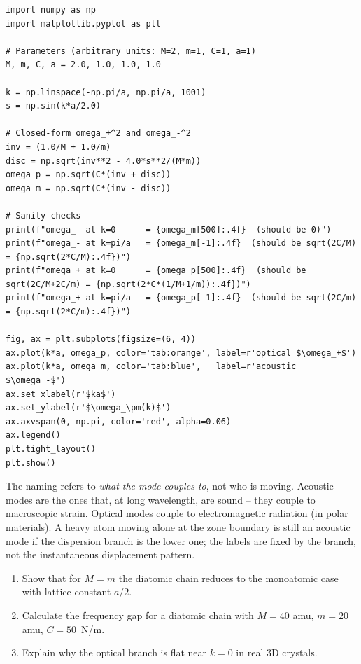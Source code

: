 \documentclass[11pt,a4paper]{article}
\begin{document}
\begin{pybox}
\begin{lstlisting}
import numpy as np
import matplotlib.pyplot as plt

# Parameters (arbitrary units: M=2, m=1, C=1, a=1)
M, m, C, a = 2.0, 1.0, 1.0, 1.0

k = np.linspace(-np.pi/a, np.pi/a, 1001)
s = np.sin(k*a/2.0)

# Closed-form omega_+^2 and omega_-^2
inv = (1.0/M + 1.0/m)
disc = np.sqrt(inv**2 - 4.0*s**2/(M*m))
omega_p = np.sqrt(C*(inv + disc))
omega_m = np.sqrt(C*(inv - disc))

# Sanity checks
print(f"omega_- at k=0      = {omega_m[500]:.4f}  (should be 0)")
print(f"omega_- at k=pi/a   = {omega_m[-1]:.4f}  (should be sqrt(2C/M) = {np.sqrt(2*C/M):.4f})")
print(f"omega_+ at k=0      = {omega_p[500]:.4f}  (should be sqrt(2C/M+2C/m) = {np.sqrt(2*C*(1/M+1/m)):.4f})")
print(f"omega_+ at k=pi/a   = {omega_p[-1]:.4f}  (should be sqrt(2C/m) = {np.sqrt(2*C/m):.4f})")

fig, ax = plt.subplots(figsize=(6, 4))
ax.plot(k*a, omega_p, color='tab:orange', label=r'optical $\omega_+$')
ax.plot(k*a, omega_m, color='tab:blue',   label=r'acoustic $\omega_-$')
ax.set_xlabel(r'$ka$')
ax.set_ylabel(r'$\omega_\pm(k)$')
ax.axvspan(0, np.pi, color='red', alpha=0.06)
ax.legend()
plt.tight_layout()
plt.show()
\end{lstlisting}
\end{pybox}

\begin{pitbox}
The naming refers to \emph{what the mode couples to}, not who is moving. Acoustic
modes are the ones that, at long wavelength, are sound -- they couple to macroscopic
strain. Optical modes couple to electromagnetic radiation (in polar materials).
A heavy atom moving alone at the zone boundary is still an acoustic mode if the
dispersion branch is the lower one; the labels are fixed by the branch, not the
instantaneous displacement pattern.
\end{pitbox}

\begin{probbox}
\begin{enumerate}
\item Show that for $M=m$ the diatomic chain reduces to the monoatomic case with
lattice constant $a/2$.
\item Calculate the frequency gap for a diatomic chain with $M=40$ amu, $m=20$ amu,
$C=50$~N/m.
\item Explain why the optical branch is flat near $k=0$ in real 3D crystals.
\end{enumerate}
\end{probbox}
\end{document}
